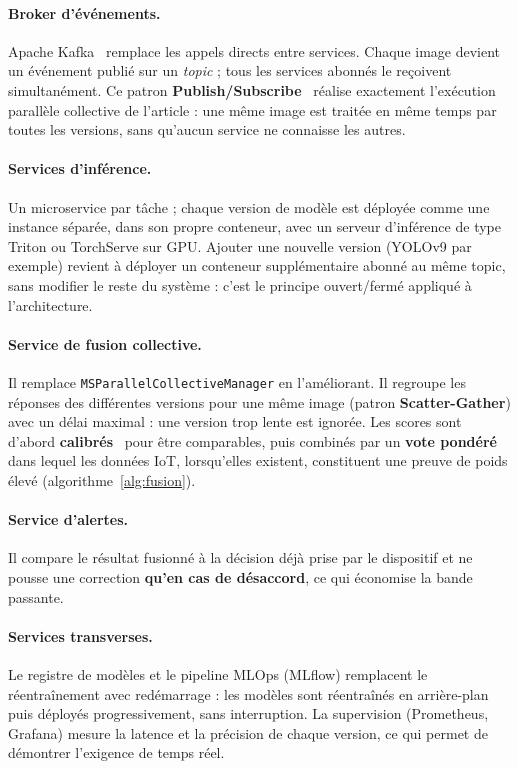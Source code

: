 \documentclass[11pt,a4paper]{report}
\newcommand{\ms}[1]{\texttt{#1}}
\begin{document}
\paragraph{Broker d'événements.} Apache Kafka~\cite{kreps2011} remplace les appels directs entre services. Chaque image devient un événement publié sur un \emph{topic} ; tous les services abonnés le reçoivent simultanément. Ce patron \textbf{Publish/Subscribe}~\cite{hohpe2003} réalise exactement l'exécution parallèle collective de l'article : une même image est traitée en même temps par toutes les versions, sans qu'aucun service ne connaisse les autres.

\paragraph{Services d'inférence.} Un microservice par tâche ; chaque version de modèle est déployée comme une instance séparée, dans son propre conteneur, avec un serveur d'inférence de type Triton ou TorchServe sur GPU. Ajouter une nouvelle version (YOLOv9 par exemple) revient à déployer un conteneur supplémentaire abonné au même topic, sans modifier le reste du système : c'est le principe ouvert/fermé appliqué à l'architecture.

\paragraph{Service de fusion collective.} Il remplace \ms{MSParallelCollectiveManager} en l'améliorant. Il regroupe les réponses des différentes versions pour une même image (patron \textbf{Scatter-Gather}) avec un délai maximal : une version trop lente est ignorée. Les scores sont d'abord \textbf{calibrés}~\cite{guo2017} pour être comparables, puis combinés par un \textbf{vote pondéré} dans lequel les données IoT, lorsqu'elles existent, constituent une preuve de poids élevé (algorithme~\ref{alg:fusion}).

\paragraph{Service d'alertes.} Il compare le résultat fusionné à la décision déjà prise par le dispositif et ne pousse une correction \textbf{qu'en cas de désaccord}, ce qui économise la bande passante.

\paragraph{Services transverses.} Le registre de modèles et le pipeline MLOps (MLflow) remplacent le réentraînement avec redémarrage : les modèles sont réentraînés en arrière-plan puis déployés progressivement, sans interruption. La supervision (Prometheus, Grafana) mesure la latence et la précision de chaque version, ce qui permet de démontrer l'exigence de temps réel.
\end{document}
